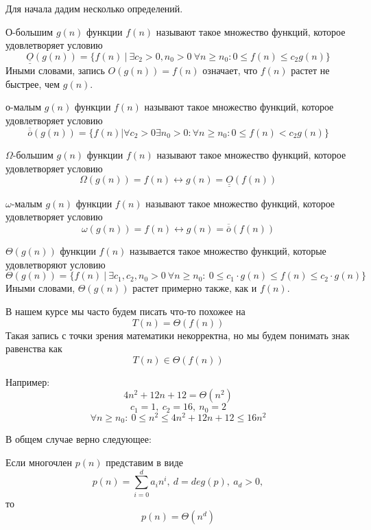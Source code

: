 \documentclass[../book.tex]{subfiles}
\begin{document}
	Для начала дадим несколько определений.
	\begin{definition}
		О-большим $g(n)$ функции $f(n)$ называют такое множество функций, которое удовлетворяет условию
		\[
		\underline{\underline{O}}(g(n)) = \{f(n) \ | \ \exists c_2>0, n_0>0 \ \forall n\geqslant n_0: 0 \leqslant f(n) \leqslant c_2 g(n)\}
		\]
		Иными словами, запись $O(g(n)) = f(n)$ означает, что $f(n)$ растет не быстрее, чем $g(n)$.
	\end{definition}
	\begin{definition}
		о-малым $g(n)$ функции $f(n)$ называют такое множество функций, которое удовлетворяет условию
		\[
		\overline{\overline{o}}(g(n)) = \{f(n)|\forall c_2>0\exists n_0>0:\forall n\geqslant  n_0: 0 \leqslant f(n) < c_2 g(n)\}
		\]
	\end{definition}
	
	\begin{definition}
		$\Omega$-большим $g(n)$ функции $f(n)$ называют такое множество функций, которое удовлетворяет условию
		\[
		\Omega(g(n)) = f(n) \leftrightarrow g(n) = \underline{\underline{O}}(f(n))
		\]
	\end{definition}
	
	\begin{definition}
		$\omega$-малым $g(n)$ функции $f(n)$ называют такое множество функций, которое удовлетворяет условию
		\[
		\omega(g(n)) = f(n) \leftrightarrow g(n) = \overline{\overline{o}}(f(n))
		\]
	\end{definition}
		

	
	\begin{definition}
		$\Theta(g(n))$ функции $f(n)$ называется такое множество функций, которые удовлетворяют условию
		\[\Theta(g(n)) = 
		\{
		f(n) \ | \ 
		\exists c_1, c_2,n_0 > 0 \ \forall n\geqslant n_0: \
		0\leqslant c_1\cdot g(n)\leqslant f(n) \leqslant c_2 \cdot g(n)
		\}
		\]
		Иными словами, $\Theta(g(n))$ растет примерно также, как и $f(n)$.
	\end{definition}

	
	В нашем курсе мы часто будем писать что-то похожее на
	\[
	T(n) = \Theta(f(n))
	\]
	Такая запись с точки зрения математики некорректна, но мы будем понимать знак равенства как
	\[
	T(n) \in \Theta(f(n))
	\]
	
	Например:
	\[
	4n^2+12n+12 = \Theta(n^2)
	\]
	\[
	c_1 = 1, \ c_2 = 16, \	n_0 = 2
	\]
	\[
	\forall n \geqslant n_0: \ 0 \leqslant n^2 \leqslant 4n^2+12n+12 \leqslant 16n^2
	\]
	
	В общем случае верно следующее:
	\begin{lemma}
		Если многочлен $p(n)$ представим в виде
		\[
		p(n) = \sum_{i = 0}^{d}	a_in^i, \ d = deg(p), \ a_d > 0, 
		\]
		то 
		\[
		p(n) = \Theta(n^d)
		\]
	\end{lemma}
	
\end{document}
